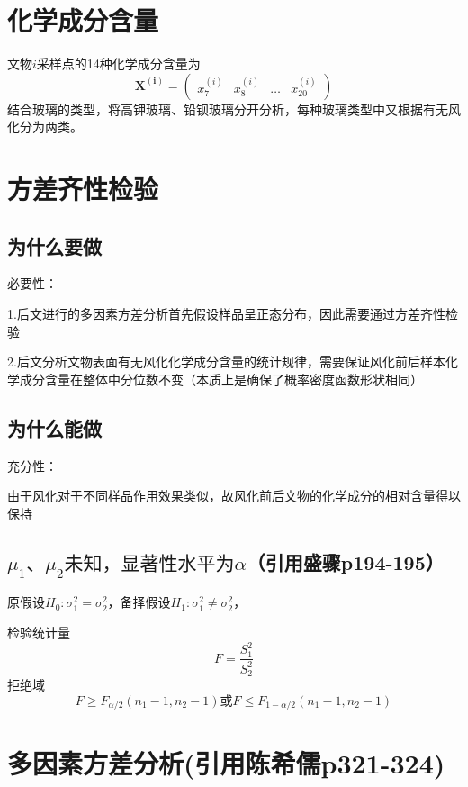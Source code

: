 \section{化学成分含量}

文物$i$采样点的14种化学成分含量为
\[ \boldsymbol{X^{(i)}} = \left(\begin{array}{cccc}
     x_7^{(i)} & x_8^{(i)} & \ldots & x_{20}^{(i)}
   \end{array}\right) \]
结合玻璃的类型，将高钾玻璃、铅钡玻璃分开分析，每种玻璃类型中又根据有无风化分为两类。

\section{方差齐性检验}

\subsection{为什么要做}

必要性：

1.后文进行的多因素方差分析首先假设样品呈正态分布，因此需要通过方差齐性检验

2.后文分析文物表面有无风化化学成分含量的统计规律，需要保证风化前后样本化学成分含量在整体中分位数不变（本质上是确保了概率密度函数形状相同）

\subsection{为什么能做}

充分性：

由于风化对于不同样品作用效果类似，故风化前后文物的化学成分的相对含量得以保持

\subsection{$\mu_1 、 \mu_2 未知，显著性水平为
\alpha$（引用盛骤p194-195）}

原假设$H_0 : \sigma^2_1 = \sigma^2_2$，备择假设$H_1 : \sigma^2_1 \neq
\sigma^2_2$，

检验统计量
\[ F = \frac{S^2_1}{S^2_2} \]
拒绝域
\[ F \geqslant F_{\alpha / 2} (n_1 - 1, n_2 - 1) 或F \leqslant F_{1 - \alpha
   / 2} (n_1 - 1, n_2 - 1) \]

\section{多因素方差分析(引用陈希儒p321-324)}

